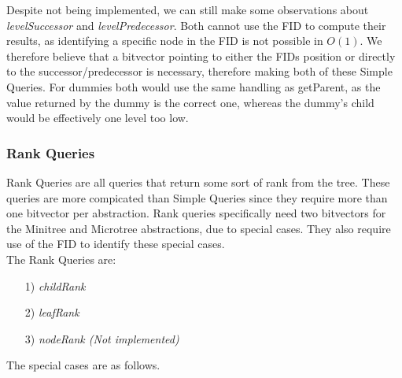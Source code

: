 \documentclass{article}
\begin{document}
Despite not being implemented, we can still make some observations about 
\textit{levelSuccessor} and \textit{levelPredecessor}. Both cannot use the FID to compute their results, as identifying a specific node in the FID is not possible in $O(1)$. We therefore believe that a bitvector pointing to either the FIDs position or directly to the successor/predecessor is necessary, therefore making both of these Simple Queries. For dummies both would use the same handling as getParent, as the value returned by the dummy is the correct one, whereas the dummy's child would be effectively one level too low.

\subsubsection{Rank Queries}
Rank Queries are all queries that return some sort of rank from the tree. These queries are more compicated than Simple Queries since they require more than one bitvector per abstraction.
Rank queries specifically need two bitvectors for the Minitree and Microtree abstractions, due to special cases.
They also require use of the FID to identify these special cases.\\
The Rank Queries are:\\
\begin{itemize}
	\item[1)] \textit{childRank}
	\item[2)] \textit{leafRank}
	\item[3)] \textit{nodeRank (Not implemented)}
\end{itemize}
The special cases are as follows.\\
\end{document}
